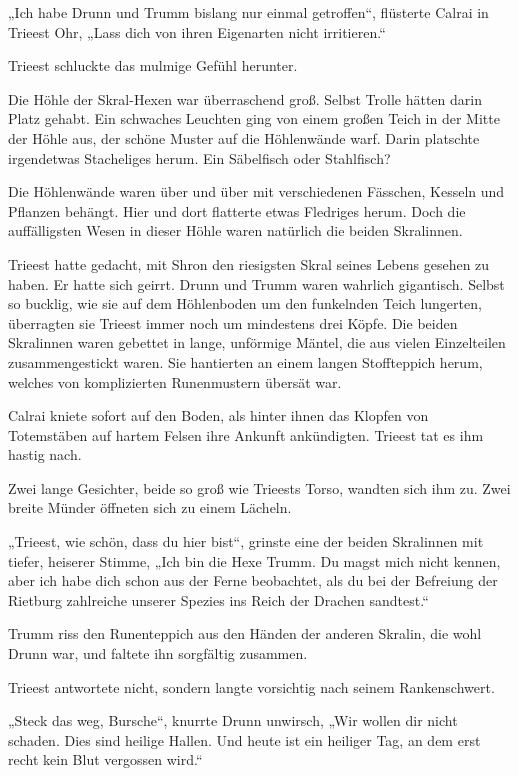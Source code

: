 „Ich habe Drunn und Trumm bislang nur einmal getroffen“, flüsterte Calrai in Trieest Ohr, „Lass dich von ihren Eigenarten nicht irritieren.“

Trieest schluckte das mulmige Gefühl herunter.



\trennzeichen



Die Höhle der Skral-Hexen war überraschend groß. Selbst Trolle hätten darin Platz gehabt. Ein schwaches Leuchten ging von einem großen Teich in der Mitte der Höhle aus, der schöne Muster auf die Höhlenwände warf. Darin platschte irgendetwas Stacheliges herum. Ein Säbelfisch oder Stahlfisch?

Die Höhlenwände waren über und über mit verschiedenen Fässchen, Kesseln und Pflanzen behängt. Hier und dort flatterte etwas Fledriges herum. Doch die auffälligsten Wesen in dieser Höhle waren natürlich die beiden Skralinnen.

Trieest hatte gedacht, mit Shron den riesigsten Skral seines Lebens gesehen zu haben. Er hatte sich geirrt. Drunn und Trumm waren wahrlich gigantisch. Selbst so bucklig, wie sie auf dem Höhlenboden um den funkelnden Teich lungerten, überragten sie Trieest immer noch um mindestens drei Köpfe. Die beiden Skralinnen waren gebettet in lange, unförmige Mäntel, die aus vielen Einzelteilen zusammengestickt waren. Sie hantierten an einem langen Stoffteppich herum, welches von komplizierten Runenmustern übersät war.

Calrai kniete sofort auf den Boden, als hinter ihnen das Klopfen von Totemstäben auf hartem Felsen ihre Ankunft ankündigten. Trieest tat es ihm hastig nach.

Zwei lange Gesichter, beide so groß wie Trieests Torso, wandten sich ihm zu. Zwei breite Münder öffneten sich zu einem Lächeln.

„Trieest, wie schön, dass du hier bist“, grinste eine der beiden Skralinnen mit tiefer, heiserer Stimme, „Ich bin die Hexe Trumm. Du magst mich nicht kennen, aber ich habe dich schon aus der Ferne beobachtet, als du bei der Befreiung der Rietburg zahlreiche unserer Spezies ins Reich der Drachen sandtest.“

Trumm riss den Runenteppich aus den Händen der anderen Skralin, die wohl Drunn war, und faltete ihn sorgfältig zusammen.

Trieest antwortete nicht, sondern langte vorsichtig nach seinem Rankenschwert.

„Steck das weg, Bursche“, knurrte Drunn unwirsch, „Wir wollen dir nicht schaden. Dies sind heilige Hallen. Und heute ist ein heiliger Tag, an dem erst recht kein Blut vergossen wird.“

